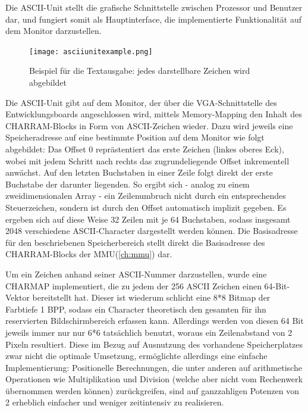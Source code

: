
\label{ch:asciiunit}
Die ASCII-Unit stellt die grafische Schnittstelle zwischen Prozessor und Benutzer dar, und fungiert somit als Hauptinterface, die implementierte Funktionalit\"at auf dem Monitor darzustellen.

\begin{figure}[!htbp]
	\centering
	\label{fig:exampletext}
	\texttt{[image: asciiunitexample.png]}
	\caption[Beispiel f\"ur die Textausgabe]{Beispiel f\"ur die Textausgabe: jedes darstellbare Zeichen wird abgebildet}
\end{figure}


Die ASCII-Unit gibt auf dem Monitor, der \"uber die VGA-Schnittstelle des Entwicklungsboards angeschlossen wird, mittels Memory-Mapping den Inhalt des CHARRAM-Blocks in Form von ASCII-Zeichen wieder. Dazu wird jeweils eine Speicheradresse auf eine bestimmte Position auf dem Monitor wie folgt abgebildet: Das Offset 0 repr\"astentiert das erste Zeichen (linkes oberes Eck), wobei mit jedem Schritt nach rechts das zugrundeliegende Offset inkrementell anw\"achst. Auf den letzten Buchstaben in einer Zeile folgt direkt der erste Buchstabe der darunter liegenden. So ergibt sich - analog zu einem zweidimensionalen Array - ein Zeilenumbruch nicht durch ein entsprechendes Steuerzeichen, sondern ist durch den Offset automatisch implizit gegeben. Es ergeben sich auf diese Weise 32 Zeilen mit je 64 Buchstaben, sodass insgesamt 2048 verschiedene ASCII-Character dargestellt werden k\"onnen. Die Basisadresse f\"ur den beschriebenen Speicherbereich stellt direkt die Basisadresse des CHARRAM-Blocks der MMU(\ref{ch:mmu}) dar.

Um ein Zeichen anhand seiner ASCII-Nummer darzustellen, wurde eine CHARMAP implementiert, die zu jedem der 256 ASCII Zeichen einen 64-Bit-Vektor bereitstellt hat. Dieser ist wiederum schlicht eine 8*8 Bitmap der Farbtiefe 1 BPP, sodass ein Character theoretisch den gesamten f\"ur ihn reservierten Bildschirmbereich erfassen kann. Allerdings  werden von diesen 64 Bit jeweils immer nur nur 6*6 tats\"achlich benutzt, woraus ein Zeilenabstand von 2 Pixeln resultiert. Diese im Bezug auf Ausnutzung des vorhandene Speicherplatzes zwar nicht die optimale Umsetzung, erm\"oglichte allerdings eine einfache Implementierung: Positionelle Berechnungen, die unter anderen auf arithmetische Operationen wie Multiplikation und Division (welche aber nicht vom Rechenwerk \"ubernommen werden k\"onnen) zur\"uckgreifen, sind auf ganzzahligen Potenzen von 2 erheblich einfacher und weniger zeitintensiv zu realisieren.

